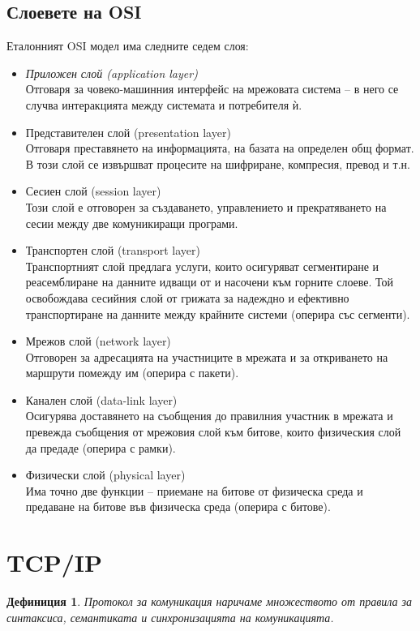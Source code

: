 \documentclass{scrartcl}
\newtheorem{definition}{Дефиниция}
\begin{document}
\subsection{Слоевете на OSI}
Еталонният OSI модел има следните седем слоя:
\begin{itemize}
\item \emph{Приложен слой (application layer)}\\ Отговаря за човеко-машинния
  интерфейс на мрежовата система – в него се случва интеракцията между системата
  и потребителя ѝ.
  \item Представителен слой (presentation layer)\\ Отговаря преставянето на
    информацията, на базата на определен общ формат. В този слой се извършват
    процесите на шифриране, компресия, превод и т.н.
  \item Сесиен слой (session layer)\\ Този слой е отговорен за създаването,
    управлението и прекратяването на сесии между две комуникиращи програми.
  \item Транспортен слой (transport layer)\\ Транспортният слой предлага услуги,
    които осигуряват сегментиране и реасемблиране на данните идващи от и
    насочени към горните слоеве. Той освобождава сесийния слой от грижата за
    надеждно и ефективно транспортиране на данните между крайните системи
    (оперира със сегменти).
  \item Мрежов слой (network layer)\\ Отговорен за адресацията на участниците в
    мрежата и за откриването на маршрути помежду им (оперира с пакети).
  \item Канален слой (data-link layer)\\ Осигурява доставянето на съобщения до
    правилния участник в мрежата и превежда съобщения от мрежовия слой към
    битове, които физическия слой да предаде (оперира с рамки).
  \item Физически слой (physical layer)\\ Има точно две функции – приемане на
    битове от физическа среда и предаване на битове във физическа среда (оперира
    с битове).
\end{itemize}

\section{TCP/IP}

\begin{definition}
  Протокол за комуникация наричаме множеството от правила за синтаксиса,
  семантиката и синхронизацията на комуникацията.
\end{definition}
\end{document}
